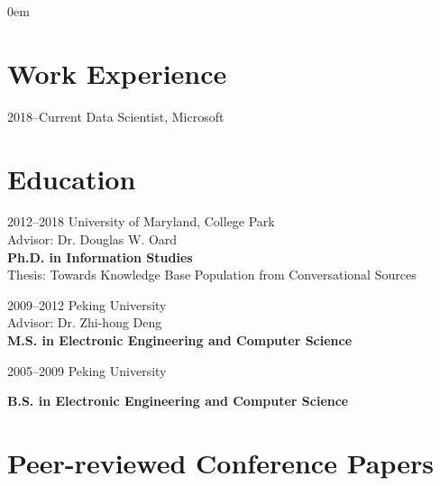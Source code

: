 \documentclass[a4paper, 11pt]{article}
\begin{document}
\large
\parindent 0em
\thispagestyle{myheadings}

   \makecvtitle


\section{Work Experience}
\begin{CV}
\item[2018--Current]  Data Scientist, Microsoft\\ 
\end{CV}
\vspace{-1mm}

\section{Education}

\begin{CV}
\item[2012--2018] University of Maryland, College Park\\
Advisor: Dr. Douglas W. Oard\\
\textbf{Ph.D. in Information Studies}\\
Thesis: Towards Knowledge Base Population from Conversational Sources
\vspace{2mm}

\item[2009--2012] Peking University\\
 Advisor: Dr. Zhi-hong Deng\\
\textbf{M.S. in Electronic Engineering and Computer Science}
\vspace{2mm}

\item[2005--2009] Peking University

\textbf{B.S. in Electronic Engineering and Computer Science}
\end{CV}
\vspace{-1mm}







\vspace{-1mm}
\section{Peer-reviewed Conference Papers}
\end{document}
